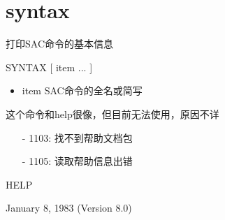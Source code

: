 \section{syntax}
\label{cmd:syntax}

打印SAC命令的基本信息

SYNTAX [ item ... ]

\begin{itemize}
\item item SAC命令的全名或简写
\end{itemize}

这个命令和help很像，但目前无法使用，原因不详

\begin{itemize}
\item[-]1103: 找不到帮助文档包
\item[-]1105: 读取帮助信息出错
\end{itemize}

HELP

January 8, 1983 (Version 8.0)
